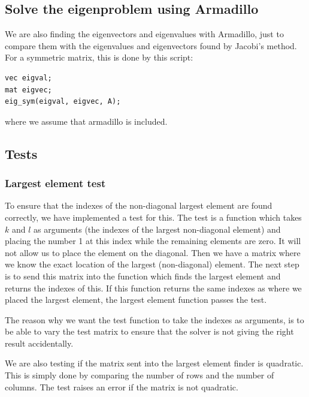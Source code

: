 \documentclass[norsk,a4paper,12pt]{article}
\begin{document}
\subsection{Solve the eigenproblem using Armadillo}
We are also finding the eigenvectors and eigenvalues with Armadillo, just to compare them with the eigenvalues and eigenvectors found by Jacobi's method. For a symmetric matrix, this is done by this script:
\begin{lstlisting}
vec eigval;
mat eigvec;
eig_sym(eigval, eigvec, A);
\end{lstlisting}
where we assume that armadillo is included. 

\subsection{Tests}
\subsubsection{Largest element test}
To ensure that the indexes of the non-diagonal largest element are found correctly, we have implemented a test for this. The test is a function which takes $k$ and $l$ as arguments (the indexes of the largest non-diagonal element) and placing the number 1 at this index while the remaining elements are zero. It will not allow us to place the element on the diagonal. Then we have a matrix where we know the exact location of the largest (non-diagonal) element. The next step is to send this matrix into the function which finds the largest element and returns the indexes of this. If this function returns the same indexes as where we placed the largest element, the largest element function passes the test.\par\vspace{3mm}
The reason why we want the test function to take the indexes as arguments, is to be able to vary the test matrix to ensure that the solver is not giving the right result accidentally.\par\vspace{3mm} 
We are also testing if the matrix sent into the largest element finder is quadratic. This is simply done by comparing the number of rows and the number of columns. The test raises an error if the matrix is not quadratic.
\end{document}
